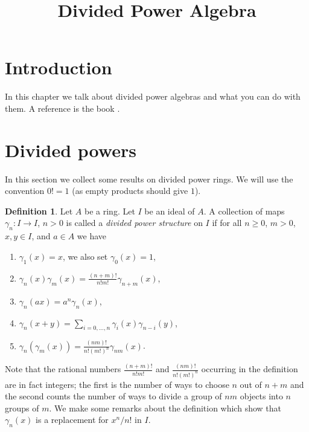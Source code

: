 \documentclass{stacks-project}
\theoremstyle{plain}
\theoremstyle{definition}
\newtheorem{definition}[subsection]{Definition}
\theoremstyle{remark}
\numberwithin{equation}{subsection}
\begin{document}
\title{Divided Power Algebra}


\maketitle

\label{section-phantom}

\tableofcontents

\section{Introduction}
\label{section-introduction}

\noindent
In this chapter we talk about divided power algebras and what
you can do with them. A reference is the book \cite{Berthelot}.





\section{Divided powers}
\label{section-divided-powers}

\noindent
In this section we collect some results on divided power rings.
We will use the convention $0! = 1$ (as empty products should give $1$).

\begin{definition}
\label{definition-divided-powers}
Let $A$ be a ring. Let $I$ be an ideal of $A$. A collection of maps
$\gamma_n : I \to I$, $n > 0$ is called a {\it divided power structure}
on $I$ if for all $n \geq 0$, $m > 0$, $x, y \in I$, and $a \in A$ we have
\begin{enumerate}
\item $\gamma_1(x) = x$, we also set $\gamma_0(x) = 1$,
\item $\gamma_n(x)\gamma_m(x) = \frac{(n + m)!}{n! m!} \gamma_{n + m}(x)$,
\item $\gamma_n(ax) = a^n \gamma_n(x)$,
\item $\gamma_n(x + y) = \sum_{i = 0, \ldots, n} \gamma_i(x)\gamma_{n - i}(y)$,
\item $\gamma_n(\gamma_m(x)) = \frac{(nm)!}{n! (m!)^n} \gamma_{nm}(x)$.
\end{enumerate}
\end{definition}

\noindent
Note that the rational numbers $\frac{(n + m)!}{n! m!}$
and $\frac{(nm)!}{n! (m!)^n}$ occurring in the definition are in fact integers;
the first is the number of ways to choose $n$ out of $n + m$ and
the second counts the number of ways to divide a group of $nm$
objects into $n$ groups of $m$.
We make some remarks about the definition which show that
$\gamma_n(x)$ is a replacement for $x^n/n!$ in $I$.
\end{document}
